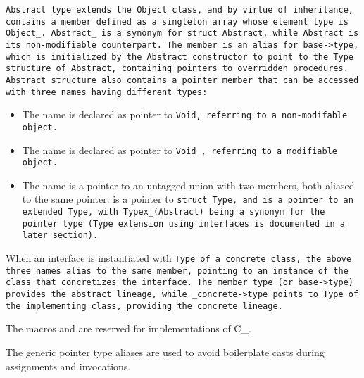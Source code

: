 \def\Subsection#1{\subsection{\idx{#1}}}

\tt{Abstract} type extends the \tt{Object} class, and by virtue of inheritance,
 contains a member 
defined as a singleton array whose element type is \tt{Object_}.
\tt{Abstract_} is a synonym for \tt{struct Abstract},
while \tt{Abstract} is its non-modifiable counterpart.
The member  is an alias for \tt{base->type},
which is initialized by the \tt{Abstract} constructor to point to the \tt{Type}
structure of \tt{Abstract}, containing pointers to overridden procedures.
\tt{Abstract} structure also contains a pointer member that
can be accessed with three names having different types:

\begin{itemize}

\item The name   is declared
as pointer to \tt{Void},  referring to a non-modifable object.

\item The name  is declared
as pointer to \tt{Void_}, referring to a modifiable object.

\item The name  is a pointer to an
untagged union with two members, both aliased to the same pointer:
  is a pointer to \tt{struct Type}, and
 is a pointer to an extended \tt{Type},
with \tt{Typex_(Abstract)} being a synonym for the pointer type
(\tt{Type} extension using interfaces is documented in a later section).

\end{itemize}

When an interface is instantiated with \tt{Type} of a concrete class,
the above three names alias to the same member, pointing
to an instance of the class that concretizes the interface.
The member \tt{type} (or \tt{base->type}) provides the abstract lineage,
while \tt{_concrete->type} points to \tt{Type} of the
implementing class, providing the concrete lineage.

The macros  and 
are reserved for implementations of C\_.

\note The generic pointer type aliases are used to avoid
boilerplate casts during assignments and invocations.

\Subsection{concrete_}
